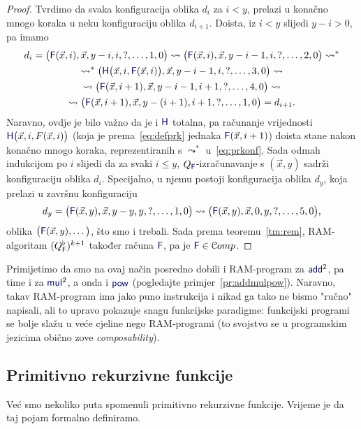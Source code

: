 \begin{proof}
Tvrdimo da svaka konfiguracija oblika $d_i$ za $i<y$, prelazi u konačno mnogo koraka u neku konfiguraciju oblika $d_{i+1}$. Doista, iz $i<y$ slijedi $y-i>0$, pa imamo
\begin{multline}\label{eq:prkonf}
    d_i=\bigl(\f F(\vec x,i),\vec x,y-i,i,?,\dotsc,1,0\bigr)\leadsto
    \bigl(\f F(\vec x,i),\vec x,y-i-1,i,?,\dotsc,2,0\bigr)\leadsto^*\\
    \leadsto^*\bigl(\f H\bigl(\vec x,i,\f F(\vec x,i)\bigr),\vec x,y-i-1,i,?,\dotsc,3,0\bigr)\leadsto\\
    \leadsto\bigl(\f F(\vec x,i+1),\vec x,y-i-1,i+1,?,\dotsc,4,0\bigr)\leadsto\\
    \leadsto\bigl(\f F(\vec x,i+1),\vec x,y-(i+1),i+1,?,\dotsc,1,0\bigr)= d_{i+1}\text.
\end{multline}
Naravno, ovdje je bilo važno da je i $\f H$ totalna, pa računanje vrijednosti $\f H\bigl(\vec x,i,F(\vec x,i)\bigr)$ (koja je prema~\eqref{eq:defprk} jednaka $\f F(\vec x,i+1)$) doista stane nakon konačno mnogo koraka, reprezentiranih s $\leadsto^*$ u~\eqref{eq:prkonf}. Sada odmah indukcijom po $i$ slijedi da za svaki $i\le y$, $Q_{\f F}$-izračunavanje s $(\vec x,y)$ sadrži konfiguraciju oblika $d_i$. Specijalno, u njemu postoji konfiguracija oblika $d_y$, koja prelazi u završnu konfiguraciju
\begin{equation}
    d_y=\bigl(\f F(\vec x,y),\vec x,y-y,y,?,\dotsc,1,0\bigr)\leadsto\bigl(\f F(\vec x,y),\vec x,0,y,?,\dotsc,5,0\bigr)\text,
\end{equation}
oblika $\bigl(\f F(\vec x,y),\dotsc\bigr)$, što smo i trebali. Sada prema teoremu~\ref{tm:rem}, RAM-algoritam $(Q_{\f F}^\flat)^{k+1}$ također računa $\f F$, pa je $\f F\in\mathcal Comp$.
\end{proof}

Primijetimo da smo na ovaj način posredno dobili i RAM-program za $\f{add}^2$, pa time i za $\f{mul}^2$, a onda i $\f{pow}$ (pogledajte primjer~\ref{pr:addmulpow}). Naravno, takav RAM-program ima jako puno instrukcija i nikad ga tako ne bismo "ručno" napisali, ali to upravo pokazuje snagu funkcijske paradigme: funkcijski programi se bolje slažu u veće cjeline nego RAM-programi (to svojstvo se u programskim jezicima obično zove \emph{composability}). 
\subsection{Primitivno rekurzivne funkcije}

Već smo nekoliko puta spomenuli primitivno rekurzivne funkcije. Vrijeme je da taj pojam formalno definiramo.


